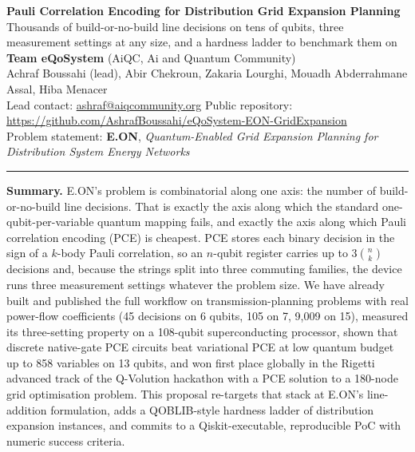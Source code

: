 \documentclass[10pt,a4paper]{article}
\newcommand{\repourl}{https://github.com/AshrafBoussahi/eQoSystem-EON-GridExpansion}
\begin{document}
\begin{center}
{\color{eon}\bfseries\Large Pauli Correlation Encoding for Distribution Grid
Expansion Planning}\\[3pt]
{\large Thousands of build-or-no-build line decisions on tens of qubits,
three measurement settings at any size, and a hardness ladder to benchmark
them on}\\[6pt]
{\bfseries Team eQoSystem} \quad (AiQC, Ai and Quantum Community)\\[2pt]
Achraf Boussahi (lead), Abir Chekroun, Zakaria Lourghi,
Mouadh Abderrahmane Assal, Hiba Menacer\\[2pt]
Lead contact: \href{mailto:ashraf@aiqcommunity.org}{ashraf@aiqcommunity.org}
\quad Public repository: \url{\repourl}\\[2pt]
Problem statement: \textbf{E.ON}, \emph{Quantum-Enabled Grid Expansion Planning
for Distribution System Energy Networks}
\end{center}
\vspace{2pt}
\hrule
\vspace{4pt}

\textbf{Summary.} E.ON's problem is combinatorial along one axis: the number of
build-or-no-build line decisions. That is exactly the axis along which the
standard one-qubit-per-variable quantum mapping fails, and exactly the axis
along which Pauli correlation encoding (PCE) is cheapest. PCE stores each
binary decision in the sign of a $k$-body Pauli correlation, so an $n$-qubit
register carries up to $3\binom{n}{k}$ decisions and, because the strings
split into three commuting families, the device runs three measurement
settings whatever the problem size. We have already built and published the
full workflow on transmission-planning problems with real power-flow
coefficients (45 decisions on 6 qubits, 105 on 7, 9,009 on 15), measured its
three-setting property on a 108-qubit superconducting processor, shown that
discrete native-gate PCE circuits beat variational PCE at low quantum budget
up to 858 variables on 13 qubits, and won first place globally in the Rigetti
advanced track of the Q-Volution hackathon with a PCE solution to a 180-node
grid optimisation problem. This proposal re-targets that stack at E.ON's
line-addition formulation, adds a QOBLIB-style hardness ladder of distribution
expansion instances, and commits to a Qiskit-executable, reproducible PoC with
numeric success criteria.

\end{document}
